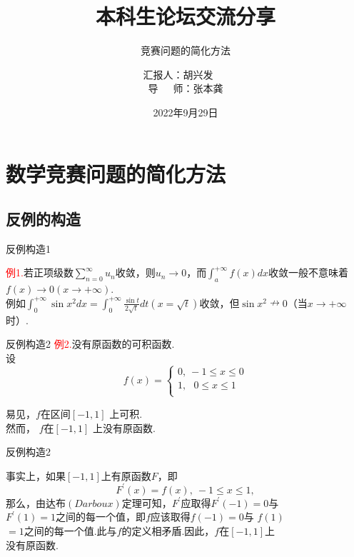 \documentclass{beamer}
\author{汇报人：胡兴发\ \ \ \\导\ \ \ 师：张本龚} %
\title{本科生论坛交流分享} %
\subtitle{竞赛问题的简化方法} %
\institute{数理科学学院}
\date{2022年9月29日} %
\institute[IaHS]{}
\begin{document}
\kaishu
\begin{frame}
    \titlepage
\end{frame}






\section{数学竞赛问题的简化方法}
\subsection{反例的构造}
\begin{frame}{反例构造1}
\begin{spacing}{2.0}
\textcolor{red}{例1.}若正项级数$\sum\limits_{n=0}^{\infty}u_n$收敛，则$u_n\to 0$，而$\int_{a}^{+\infty}f(x)dx $收敛一般不意味着$f(x)\to 0(x\to  +\infty)$.\\ \vspace{.5cm}例如$\int_{0}^{+\infty}\sin x^2dx =  \int_{0}^{+\infty} \frac{\sin t}{2\sqrt t}dt(x=\sqrt t)$收敛，但$\sin x^2\nrightarrow 0$（当$x\to +\infty$时）.
	\end{spacing}
\end{frame}

\begin{frame}{反例构造2}
		\textcolor{red}{例2.}没有原函数的可积函数.\\
		设
		$$
		f\left( x \right) =\left\{ 
			\begin{array}{l}
			0,\ -1\le x\le 0\\
			1,\ \ \ 0\le x\le 1\\
			\end{array} \right. 
		$$
		
		
		$
		\text{易见，}
		f
		\text{在区间}\left[ -1,1 \right] 
		$
		上可积.\\然而，
		$
		f\text{在}\left[ -1,1 \right] 
		$
		上没有原函数.
\end{frame}
\begin{frame}{反例构造2}
	\begin{spacing}{1.5}
		
事实上，如果$\left[ -1,1 \right] \text{上有原函数}F\text{，即}$
$$F^{'}\left( x \right) =f\left( x \right) ,\ -1\le x\le 1,$$
那么，由达布$\left( Darboux \right)$定理可知，$F^{'}$应取得$F^{'}\left( -1 \right) =0$与\\
$F^{'}\left( 1 \right)=1$之间的每一个值，即$f$应该取得$f\left( -1 \right) =0$与
$f\left( 1 \right)$\\
$=1$之间的每一个值.此与$f$的定义相矛盾.因此，$f\text{在}\left[ -1,1 \right] $上\\
没有原函数.

\end{spacing}
\end{frame}
\end{document}
